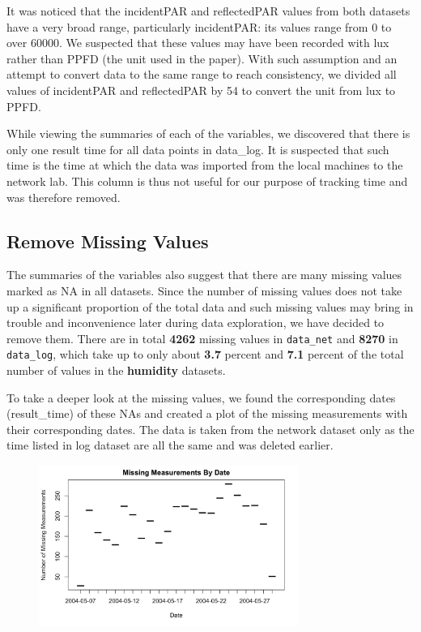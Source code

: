 \documentclass[twocolumn,11pt]{asme2ej}
\begin{document}
It was noticed that the incidentPAR and reflectedPAR values from both datasets have a very broad range, particularly incidentPAR: its values range from 0 to over 60000. We suspected that these values may have been recorded with lux rather than PPFD (the unit used in the paper). With such assumption and an attempt to convert data to the same range to reach consistency, we divided all values of incidentPAR and reflectedPAR by 54 to convert the unit from lux to PPFD. 

While viewing the summaries of each of the variables, we discovered that there is only one result time for all data points in data\_log. It is suspected that such time is the time at which the data was imported from the local machines to the network lab. This column is thus not useful for our purpose of tracking time and was therefore removed.
\subsection{Remove Missing Values}

The summaries of the variables also suggest that there are many missing values marked as NA in all datasets. Since the number of missing values does not take up a significant proportion of the total data and such missing values may bring in trouble and inconvenience later during data exploration, we have decided to remove them. There are in total \textbf{4262} missing values in \texttt{data\_net} and \textbf{8270} in \texttt{data\_log}, which take up to only about \textbf{3.7} percent and \textbf{7.1} percent of the total number of values in the \textbf{humidity} datasets.

To take a deeper look at the missing values, we found the corresponding dates (result\_time) of these NAs and created a plot of the missing measurements with their corresponding dates. The data is taken from the network dataset only as the time listed in log dataset are all the same and was deleted earlier. 

\begin{figure}
    \centering
    \includegraphics[width=85mm]{2b.png} 
    \caption{}
    \label{fig:2b}
\end{figure}
 
\end{document}
